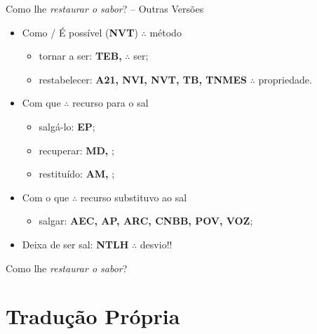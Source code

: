 \documentclass[12pt,aspectratio=169]{beamer}
\newcommand{\YEL}[1]{{\textcolor{TXyel}{#1}}}
\newcommand{\BRI}[1]{{\textcolor{BSpbg}{#1}}}   %
\begin{document}
    \begin{frame}{\BRI{Como lhe \textit{restaurar o sabor\/}? -- Outras Versões}}
        \begin{itemize}
            \item<1-> \YEL{Como} / \YEL{É possível} (\BRI{\bf NVT}) $\therefore$ método
                \begin{itemize}
                    \item<1-> \YEL{tornar a ser}: \BRI{\textbf{TEB, }} $\therefore$ ser;
                    \item<2-> \YEL{restabelecer}: \BRI{\textbf{A21, NVI, NVT, TB, TNMES}} $\therefore$ propriedade.
                \end{itemize}
            \item<3-> \YEL{Com que} $\therefore$ recurso para o sal
                \begin{itemize}
                    \item<3-> \YEL{salgá-lo}: \BRI{\textbf{EP}};
                    \item<4-> \YEL{recuperar}: \BRI{\textbf{MD, }};
                    \item<5-> \YEL{restituído}: \BRI{\textbf{AM, }};
                \end{itemize}
            \item<6-> \YEL{Com o que} $\therefore$ recurso substituvo ao sal
                \begin{itemize}
                    \item<7-> \YEL{salgar}: \BRI{\textbf{AEC, AP, ARC, CNBB, POV, VOZ}};
                \end{itemize}
            \item<8-> \YEL{Deixa de ser sal}: \BRI{\textbf{NTLH}} $\therefore$ desvio!!
        \end{itemize}
    \end{frame}

    \begin{frame}{\BRI{Como lhe \YEL{\textit{restaurar o sabor\/}}?}}
    \end{frame}

\section{Tradução Própria}
\end{document}
